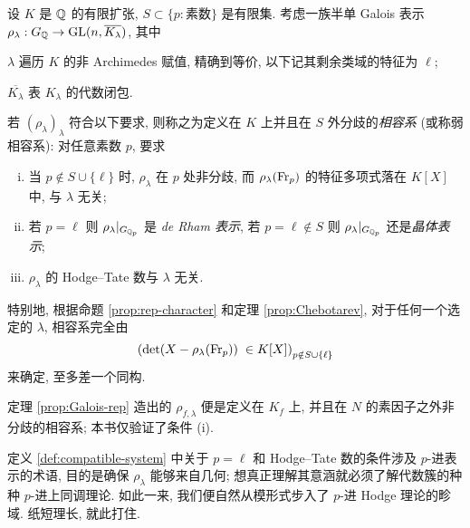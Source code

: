 \begin{definition}\label{def:compatible-system} 
	设 $K$ 是 $\mathbb{Q}$ 的有限扩张, $S \subset \{p: \text{素数}\}$ 是有限集. 考虑一族半单 Galois 表示 $\rho_\lambda: G_{\mathbb{Q}} \to \operatorname{GL}(n, \overline{K_\lambda})$, 其中
	\begin{compactitem}
		\item $\lambda$ 遍历 $K$ 的非 Archimedes 赋值, 精确到等价, 以下记其剩余类域的特征为 $\ell$;
		\item $\overline{K_\lambda}$ 表 $K_\lambda$ 的代数闭包.
	\end{compactitem}

	若 $(\rho_\lambda)_\lambda$ 符合以下要求, 则称之为定义在 $K$ 上并且在 $S$ 外分歧的\emph{相容系} (或称弱相容系): 对任意素数 $p$, 要求
	\begin{enumerate}[(i)]
		\item 当 $p \notin S \cup \{\ell\}$ 时, $\rho_\lambda$ 在 $p$ 处非分歧, 而 $\rho_\lambda(\operatorname{Fr}_p)$ 的特征多项式落在 $K[X]$ 中, 与 $\lambda$ 无关;
		\item 若 $p = \ell$ 则 $\rho_\lambda |_{G_{\mathbb{Q}_p}}$ 是 \emph{de Rham 表示}, 若 $p = \ell \notin S$ 则 $\rho_\lambda |_{G_{\mathbb{Q}_p}}$ 还是\emph{晶体表示};
		\item $\rho_\lambda$ 的 Hodge--Tate 数与 $\lambda$ 无关. 
	\end{enumerate}
\end{definition}
特别地, 根据命题 \ref{prop:rep-character} 和定理 \ref{prop:Chebotarev}, 对于任何一个选定的 $\lambda$, 相容系完全由
\[ \left( \det(X - \rho_\lambda(\operatorname{Fr}_p)) \; \in K[X] \right)_{p \notin S \cup \{\ell\} } \]
来确定, 至多差一个同构.

\begin{example}
	定理 \ref{prop:Galois-rep} 造出的 $\rho_{f, \lambda}$ 便是定义在 $K_f$ 上, 并且在 $N$ 的素因子之外非分歧的相容系; 本书仅验证了条件 (i).
\end{example}

定义 \ref{def:compatible-system} 中关于 $p = \ell$ 和 Hodge--Tate 数的条件涉及 $p$-进表示的术语, 目的是确保 $\rho_\lambda$ 能够来自几何; 想真正理解其意涵就必须了解代数簇的种种 $p$-进上同调理论. 如此一来, 我们便自然从模形式步入了 $p$-进 Hodge 理论的畛域. 纸短理长, 就此打住.
